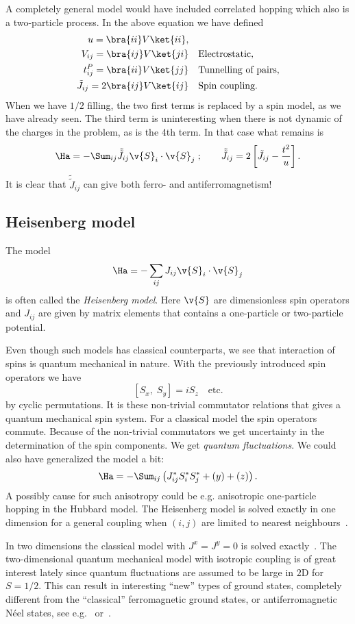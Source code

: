A completely general model would have included correlated hopping which also is a two-particle process. In the above equation we have defined
\[
  \begin{aligned}
	u = \bra{ii}V\ket{ii},\quad&\\
	V_{ij} = \bra{ij}V\ket{ji}\quad&\text{Electrostatic},\\
	t_{ij}^P = \bra{ii}V\ket{jj}\quad&\text{Tunnelling of pairs},\\
	\tilde{J}_{ij} = 2\bra{ij}V\ket{ij}\quad&\text{Spin coupling}.
  \end{aligned}
\]
When we have $1/2$ filling, the two first terms is replaced by a spin model, as we have already seen. The third term is uninteresting when there is not dynamic of the charges in
the problem, as is the 4th term. In that case what remains is
\[\Ha = -\Sum_{ij}\tilde{\tilde{J}}_{ij}\v{S}_i\cdot\v{S}_j\;;\quad\quad\tilde{\tilde{J}}_{ij} = 2\left[ \tilde{J}_{ij} - \frac{t^2}{u} \right].\]
It is clear that $\tilde{\tilde{J}}_{ij}$ can give both ferro- and antiferromagnetism!

\subsection{Heisenberg model}
The model
\[\Ha = -\sum_{ij}J_{ij}\v{S}_i\cdot\v{S}_j\]
is often called the \emph{Heisenberg model}. Here $\v{S}$ are dimensionless spin operators and $J_{ij}$ are given by matrix elements that contains a one-particle or two-particle
potential.

Even though such models has classical counterparts, we see that interaction of spins is quantum mechanical in nature. With the previously introduced spin operators we have
\[ [S_x,\;S_y] = iS_z\quad\text{etc.} \]
by cyclic permutations. It is these non-trivial commutator relations that gives a quantum mechanical spin system. For a classical model the spin operators commute. Because of the
non-trivial commutators we get uncertainty in the determination of the spin components. We get \emph{quantum fluctuations}. We could also have generalized the model a bit:
\[ \Ha = -\Sum_{ij}\left( J_{ij}^\ast S_i^\ast S_j^\ast + (y) + (z) \right).\]
A possibly cause for such anisotropy could be e.g. anisotropic one-particle hopping in the Hubbard model. The Heisenberg model is solved exactly in one dimension 
for a general coupling when $(i,j)$
are limited to nearest neighbours~\cite{bethe1931}.

In two dimensions the classical model with $J^x = J^y = 0$ is solved exactly~\cite{onsager1943}. The two-dimensional quantum mechanical model with isotropic coupling is of great 
interest lately since quantum fluctuations are assumed to be large in $2$D for $S=1/2$. This can result in interesting ``new'' types of ground states, completely different from the
``classical'' ferromagnetic ground states, or antiferromagnetic N\'{e}el states, see e.g.~\cite{charkravarty1989} or~\cite{chubukov1993}.

